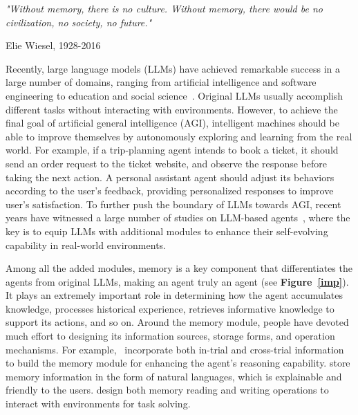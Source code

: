 \documentclass{article}
\theoremstyle{definition}
\theoremstyle{theorem}
\theoremstyle{proof}
\theoremstyle{remark}
\begin{document}
	\setlength{\epigraphwidth}{.98\textwidth}
	
	\epigraph{\textit{"Without memory, there is no culture. Without memory, there would be no civilization, no society, no future."}}{Elie Wiesel, 1928-2016}
	
	
	Recently, large language models (LLMs) have achieved remarkable success in a large number of domains, ranging from artificial intelligence and software engineering to education and social science~\cite{chatdev,s3,survey_llm_agent1}.
	Original LLMs usually accomplish different tasks without interacting with environments.
	However, to achieve the final goal of artificial general intelligence (AGI), 
	intelligent machines should be able to improve themselves by autonomously exploring and learning from the real world. 
	{For example, if a trip-planning agent intends to book a ticket, it should send an order request to the ticket website, and observe the response before taking the next action.
		A personal assistant agent should adjust its behaviors according to the user's feedback, providing personalized responses to improve user's satisfaction.}
	To further push the boundary of LLMs towards AGI, recent years have witnessed a large number of studies on LLM-based agents~\cite{survey_llm_agent1,survey_llm_agent2}, where the key is to equip LLMs with additional modules to enhance their self-evolving capability in real-world environments.
	
	Among all the added modules, memory is a key component that differentiates the agents from original LLMs, making an agent truly an agent (see \textbf{Figure~\ref{imp}}). It plays an extremely important role in determining how the agent accumulates knowledge, processes historical experience, retrieves informative knowledge to support its actions, and so on. 
	Around the memory module, people have devoted much effort to designing its information sources, storage forms, and operation mechanisms.
	For example,~\citet{reflexion} incorporate both in-trial and cross-trial information to build the memory module for enhancing the agent's reasoning capability.
	\citet{memorybank} store memory information in the form of natural languages, which is explainable and friendly to the users.
	\citet{ret_llm} design both memory reading and writing operations to interact with environments for task solving.
	
\end{document}
